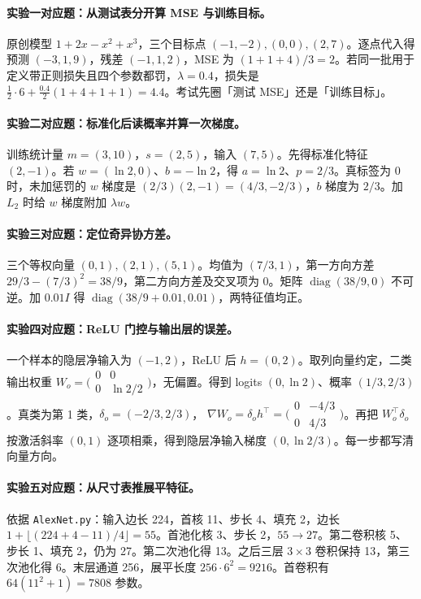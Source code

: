 \documentclass[UTF8,a4paper,zihao=-4,fontset=fandol]{ctexrep}
\begin{document}
\paragraph{实验一对应题：从测试表分开算 MSE 与训练目标。}
原创模型 $1+2x-x^2+x^3$，三个目标点 $(-1,-2),(0,0),(2,7)$。逐点代入得预测 $(-3,1,9)$，残差 $(-1,1,2)$，MSE 为 $(1+1+4)/3=2$。若同一批用于定义带正则损失且四个参数都罚，$\lambda=0.4$，损失是 $\frac12\cdot6+\frac{0.4}{2}(1+4+1+1)=4.4$。考试先圈「测试 MSE」还是「训练目标」。

\paragraph{实验二对应题：标准化后读概率并算一次梯度。}
训练统计量 $m=(3,10)$，$s=(2,5)$，输入 $(7,5)$。先得标准化特征 $(2,-1)$。若 $w=(\ln2,0)$、$b=-\ln2$，得 $a=\ln2$、$p=2/3$。真标签为 0 时，未加惩罚的 $w$ 梯度是 $(2/3)(2,-1)=(4/3,-2/3)$，$b$ 梯度为 $2/3$。加 $L_2$ 时给 $w$ 梯度附加 $\lambda w$。

\paragraph{实验三对应题：定位奇异协方差。}
三个等权向量 $(0,1),(2,1),(5,1)$。均值为 $(7/3,1)$，第一方向方差 $29/3-(7/3)^2=38/9$，第二方向方差及交叉项为 0。矩阵 $\operatorname{diag}(38/9,0)$ 不可逆。加 $0.01I$ 得 $\operatorname{diag}(38/9+0.01,0.01)$，两特征值均正。

\paragraph{实验四对应题：ReLU 门控与输出层的误差。}
一个样本的隐层净输入为 $(-1,2)$，ReLU 后 $h=(0,2)$。取列向量约定，二类输出权重 $W_o=\bigl(\begin{smallmatrix}0&0\\0&\ln2/2\end{smallmatrix}\bigr)$，无偏置。得到 logits $(0,\ln2)$、概率 $(1/3,2/3)$。真类为第 1 类，$\delta_o=(-2/3,2/3)$，
$\nabla W_o=\delta_o h^\top=\bigl(\begin{smallmatrix}0&-4/3\\0&4/3\end{smallmatrix}\bigr)$。再把 $W_o^\top\delta_o$ 按激活斜率 $(0,1)$ 逐项相乘，得到隐层净输入梯度 $(0,\ln2/3)$。每一步都写清向量方向。

\paragraph{实验五对应题：从尺寸表推展平特征。}
依据 \texttt{AlexNet.py}：输入边长 224，首核 11、步长 4、填充 2，边长 $1+\lfloor(224+4-11)/4\rfloor=55$。首池化核 3、步长 2，$55\to27$。第二卷积核 5、步长 1、填充 2，仍为 27。第二次池化得 13。之后三层 $3\times3$ 卷积保持 13，第三次池化得 6。末层通道 256，展平长度 $256\cdot6^2=9216$。首卷积有 $64(11^2+1)=7808$ 参数。
\end{document}
